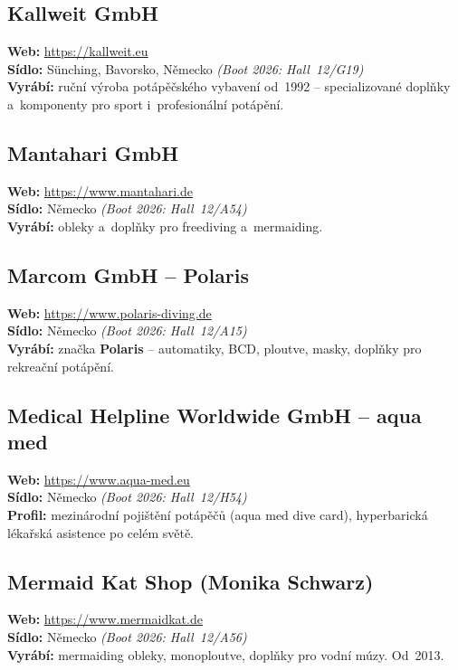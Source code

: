 \documentclass[11pt,a4paper]{article}
\begin{document}
\subsection{Kallweit GmbH}
\textbf{Web:} \url{https://kallweit.eu} \\
\textbf{Sídlo:} Sünching, Bavorsko, Německo \quad\emph{(Boot 2026: Hall~12/G19)} \\
\textbf{Vyrábí:} ruční výroba potápěčského vybavení od~1992 -- specializované doplňky a~komponenty pro sport i~profesionální potápění.

\subsection{Mantahari GmbH}
\textbf{Web:} \url{https://www.mantahari.de} \\
\textbf{Sídlo:} Německo \quad\emph{(Boot 2026: Hall~12/A54)} \\
\textbf{Vyrábí:} obleky a~doplňky pro freediving a~mermaiding.

\subsection{Marcom GmbH -- Polaris}
\textbf{Web:} \url{https://www.polaris-diving.de} \\
\textbf{Sídlo:} Německo \quad\emph{(Boot 2026: Hall~12/A15)} \\
\textbf{Vyrábí:} značka \textbf{Polaris} -- automatiky, BCD, ploutve, masky, doplňky pro rekreační potápění.

\subsection{Medical Helpline Worldwide GmbH -- aqua med}
\textbf{Web:} \url{https://www.aqua-med.eu} \\
\textbf{Sídlo:} Německo \quad\emph{(Boot 2026: Hall~12/H54)} \\
\textbf{Profil:} mezinárodní pojištění potápěčů (aqua med dive card), hyperbarická lékařská asistence po celém světě.

\subsection{Mermaid Kat Shop (Monika Schwarz)}
\textbf{Web:} \url{https://www.mermaidkat.de} \\
\textbf{Sídlo:} Německo \quad\emph{(Boot 2026: Hall~12/A56)} \\
\textbf{Vyrábí:} mermaiding obleky, monoploutve, doplňky pro vodní múzy. Od~2013.
\end{document}
